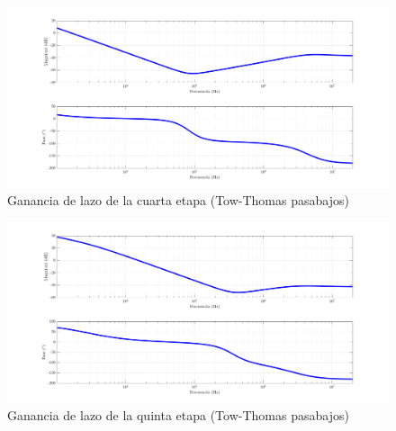\begin{figure}[H]
	\centering
	\includegraphics[width = \textwidth]{imagenes/estabilidad_etapa_4_v1}
	\caption{Ganancia de lazo de la cuarta etapa (Tow-Thomas pasabajos)}
	\label{fig:loop_gain_4}
\end{figure}
\begin{figure}[H]
	\centering
	\includegraphics[width = \textwidth]{imagenes/estabilidad_etapa_5_v1}
	\caption{Ganancia de lazo de la quinta etapa (Tow-Thomas pasabajos)}
	\label{fig:loop_gain_5}
\end{figure}
